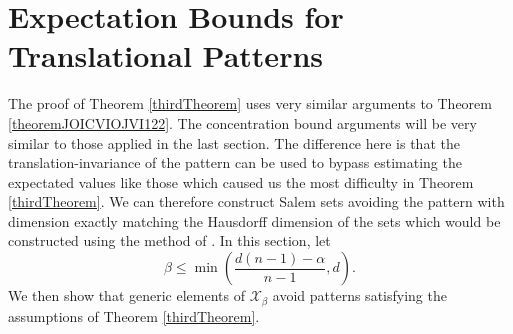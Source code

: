 \documentclass[dvipsnames,letterpaper,12pt]{article}
\numberwithin{equation}{section}
\numberwithin{theorem}{section}
\begin{document}
\section{Expectation Bounds for Translational Patterns}

The proof of Theorem \ref{thirdTheorem} uses very similar arguments to Theorem \ref{theoremJOICVIOJVI122}. The concentration bound arguments will be very similar to those applied in the last section. The difference here is that the translation-invariance of the pattern can be used to bypass estimating the expectated values like those which caused us the most difficulty in Theorem \ref{thirdTheorem}. We can therefore construct Salem sets avoiding the pattern with dimension exactly matching the Hausdorff dimension of the sets which would be constructed using the method of \cite{OurPaper}. In this section, let
%
\[ \beta \leq \min \left( \frac{d(n-1) - \alpha}{n-1}, d \right). \]
%
We then show that generic elements of $\mathcal{X}_\beta$ avoid patterns satisfying the assumptions of Theorem \ref{thirdTheorem}.
\end{document}
